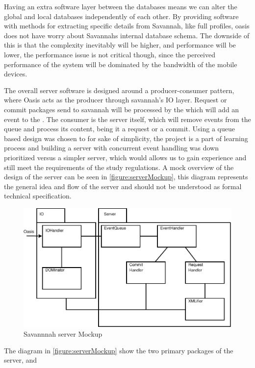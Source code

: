 Having an extra software layer between the databases means we can alter the global and local databases independently of each other. By providing software with methods for extracting specific
details from Savannah, like full profiles, oasis does not have worry about Savannahs internal database schema. The downside of this is that the complexity inevitably will be higher, and performance
will be lower, the performance issue is not critical though, since the perceived performance of the system will be dominated by the bandwidth of the mobile devices. 

The overall server software is designed around a producer-consumer pattern, where Oasis acts as the producer through savannah's IO layer.
Request or commit packages send to savannah will be processed by the  which will add an event to the . The consumer is the server itself, which will remove events from the queue and process its content, being it a request or a commit. Using a queue based design was chosen to for sake of simplicity, the project is a part of learning process and building a server with concurrent event handling was down prioritized versus a simpler server, which would allows us to gain experience and still meet the requirements of the study regulations.
 A mock overview of the design of the server can be seen in \autoref{figure:serverMockup}, this diagram represents the general idea and flow of the server and should not be understood as formal technical specification.
\begin{figure}[H]
 \centering
  \includegraphics[scale=1]{images/savaIniDesign}
 \caption{Savannnah server Mockup}
 \label{figure:serverMockup}
\end{figure}

The diagram in \autoref{figure:serverMockup} show the two primary packages of the server,  and 

